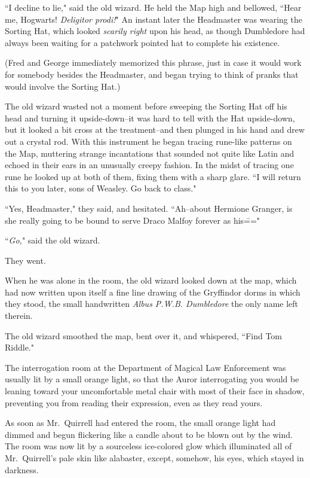 ``I decline to lie," said the old wizard. He held the Map high and bellowed, ``Hear me, Hogwarts! \emph{Deligitor prodi!}" An instant later the Headmaster was wearing the Sorting Hat, which looked \emph{scarily right} upon his head, as though Dumbledore had always been waiting for a patchwork pointed hat to complete his existence.

(Fred and George immediately memorized this phrase, just in case it would work for somebody besides the Headmaster, and began trying to think of pranks that would involve the Sorting Hat.)

The old wizard wasted not a moment before sweeping the Sorting Hat off his head and turning it upside-down\---it was hard to tell with the Hat upside-down, but it looked a bit cross at the treatment\---and then plunged in his hand and drew out a crystal rod. With this instrument he began tracing rune-like patterns on the Map, muttering strange incantations that sounded not quite like Latin and echoed in their ears in an unusually creepy fashion. In the midst of tracing one rune he looked up at both of them, fixing them with a sharp glare. ``I will return this to you later, sons of Weasley. Go back to class."

``Yes, Headmaster," they said, and hesitated. ``Ah\---about Hermione Granger, is she really going to be bound to serve Draco Malfoy forever as his\==="

``\emph{Go,}" said the old wizard.

They went.

When he was alone in the room, the old wizard looked down at the map, which had now written upon itself a fine line drawing of the Gryffindor dorms in which they stood, the small handwritten \emph{Albus P.W.B. Dumbledore} the only name left therein.

The old wizard smoothed the map, bent over it, and whispered, ``Find Tom Riddle."

\later

The interrogation room at the Department of Magical Law Enforcement was usually lit by a small orange light, so that the Auror interrogating you would be leaning toward your uncomfortable metal chair with most of their face in shadow, preventing you from reading their expression, even as they read yours.

As soon as Mr.~Quirrell had entered the room, the small orange light had dimmed and begun flickering like a candle about to be blown out by the wind. The room was now lit by a sourceless ice-colored glow which illuminated all of Mr.~Quirrell's pale skin like alabaster, except, somehow, his eyes, which stayed in darkness.

